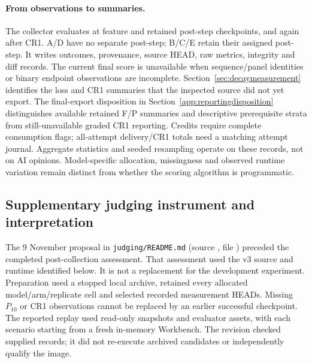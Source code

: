 \paragraph{From observations to summaries.}
The collector evaluates at feature and retained post-step checkpoints, and
again after CR1. A/D have no separate post-step; B/C/E retain their assigned
post-step. It writes outcomes, provenance, source HEAD, raw metrics,
integrity and diff records. The current final score is unavailable when
sequence/panel identities or binary endpoint observations are incomplete.
Section~\ref{sec:decaymeasurement} identifies the loss and CR1 summaries
that the inspected source did not yet export. The final-export disposition
in Section~\ref{app:reportingdisposition} distinguishes available retained
F/P summaries and descriptive prerequisite strata from still-unavailable
graded CR1 reporting.
Credits require complete consumption flags; all-attempt delivery/CR1 totals
need a matching attempt journal. Aggregate statistics and seeded resampling
operate on these records, not on AI opinions. Model-specific allocation,
missingness and observed runtime variation remain distinct from whether
the scoring algorithm is programmatic.

\subsection{Supplementary judging instrument and interpretation}\label{app:postrunjudging}

The 9 November proposal in \nolinkurl{judging/README.md}
(source , file ) preceded the completed
post-collection assessment. That assessment used the v3 source and runtime
identified below. It is not a replacement for the development experiment. Preparation used a stopped local archive,
retained every allocated model/arm/replicate cell and selected recorded
measurement HEADs.
Missing $P_{10}$ or CR1 observations cannot be replaced by an earlier
successful checkpoint. The reported replay used read-only snapshots and
evaluator assets, with each scenario starting from a fresh in-memory
Workbench. The revision checked supplied records; it did not re-execute archived
candidates or independently qualify the image.


